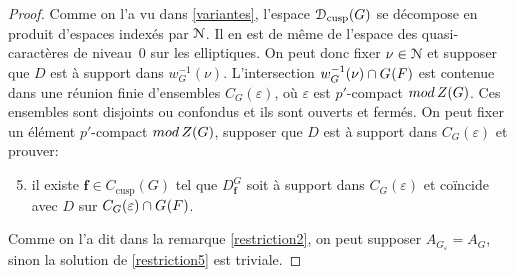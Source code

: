 \documentclass[11pt]{article}
\numberwithin{equation}{section}\providecommand{\og}{«\,}\providecommand{\fg}{\,»}
\let\mathcal \EuScript
\newcommand{\NoChangel}[1]{%
\expandafter\let\csname old\string#1\endcsname=#1
\let#1=\relax
\newcommand{#1}{\mathcode`l="716C\csname old\string#1\endcsname\mathcode`l="7160 }%
}
\let\epsilon\varepsilon
\newcommand{\rmod}{\textup{mod}\,}
\newcommand{\cusp}{\mathrm{cusp}}
\newcommand{\rell}{\mathrm{ell}} \NoChangel{\rell}
\newcommand{\bmf}{\boldsymbol{f}}
\newcommand{\cD}{\mathcal{D}}
\newcommand{\cN}{\mathcal{N}}
\theoremstyle{plain}
\theoremstyle{definition}
\begin{document}
\begin{proof}
Comme on l'a vu dans \ref{variantes}, l'espace $\cD_{\cusp}(G)$ se décompose en produit d'espaces indexés par $\cN$. Il en est de même de l'espace des quasi-caractères de niveau~$0$ sur les elliptiques. On peut donc fixer $\nu\in \cN$ et supposer que
$D$ est à support dans $w_{G}^{-1}(\nu)$. L'intersection $w_{G}^{-1}(\nu)\cap G_{\rell}(F)$ est contenue dans une réunion finie d'ensembles $ C_{G}(\epsilon )$, où $\epsilon$ est $p'$-compact $\rmod Z(G)$. Ces ensembles sont disjoints ou confondus et ils sont ouverts et fermés. On peut fixer un élément $p'$-compact $\rmod Z(G)$, supposer que $D$ est à support dans $ C_{G}(\epsilon)$ et prouver:
\begin{enumerate}\setcounter{enumi}{4}
\item\label{restriction5}
il existe $\bmf\in C_{\cusp}(G)$ tel que $D^G_{\bmf}$ soit à support dans $C_{G}(\epsilon)$ et coïncide avec $D$ sur $C_{G}(\epsilon)\cap G_{\rell}(F)$.
\end{enumerate}

Comme on l'a dit dans la remarque \eqref{restriction2}, on peut supposer $A_{G_{\epsilon}}=A_{G}$, sinon la solution de \eqref{restriction5} est triviale.


\end{proof}
\end{document}

